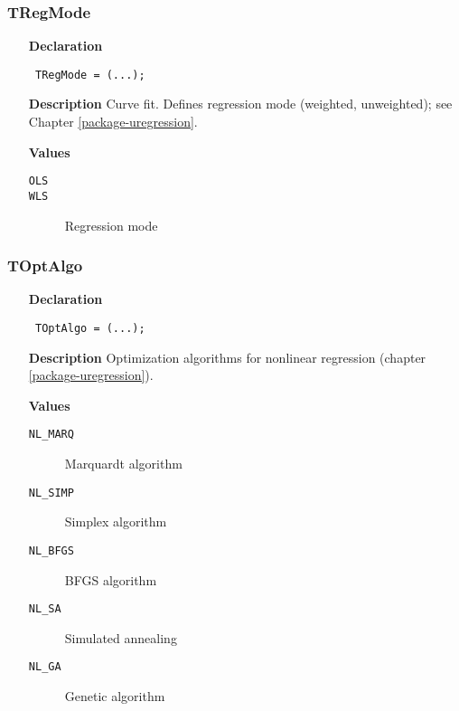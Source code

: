 \documentclass[12pt,a4paper,oneside]{report}
\newcommand{\declarationitem}[1]{\textbf{#1}}
\newcommand{\descriptiontitle}[1]{\textbf{#1}}
\newcommand{\code}[1]{\texttt{#1}}
\begin{document}
\subsubsection{TRegMode}
\label{utypes-TRegMode}
\begin{itemize}\item[\declarationitem{Declaration}\hfill]
	\begin{flushleft}
		\code{
			TRegMode = (...);}
	\end{flushleft}
	\item[\descriptiontitle{Description}]
	Curve fit. Defines regression mode (weighted, unweighted); see Chapter \ref{package-uregression}.
	
	\item[\textbf{Values}]
	\begin{description}
		\item[\texttt{OLS}]  
		\item[\texttt{WLS}] Regression mode
	\end{description}
\end{itemize}
\subsubsection{TOptAlgo}
\label{utypes-TOptAlgo}
\begin{itemize}\item[\declarationitem{Declaration}\hfill]
	\begin{flushleft}
		\code{
			TOptAlgo = (...);}
		
	\end{flushleft}
	
	\par
	\item[\descriptiontitle{Description}]
	Optimization algorithms for nonlinear regression (chapter \ref{package-uregression}).
		\item[\textbf{Values}]
	\begin{description}
		\item[\texttt{NL{\_}MARQ}] Marquardt algorithm
		\item[\texttt{NL{\_}SIMP}] Simplex algorithm
		\item[\texttt{NL{\_}BFGS}] BFGS algorithm
		\item[\texttt{NL{\_}SA}] Simulated annealing
		\item[\texttt{NL{\_}GA}] Genetic algorithm
	\end{description}
\end{itemize}
\end{document}

